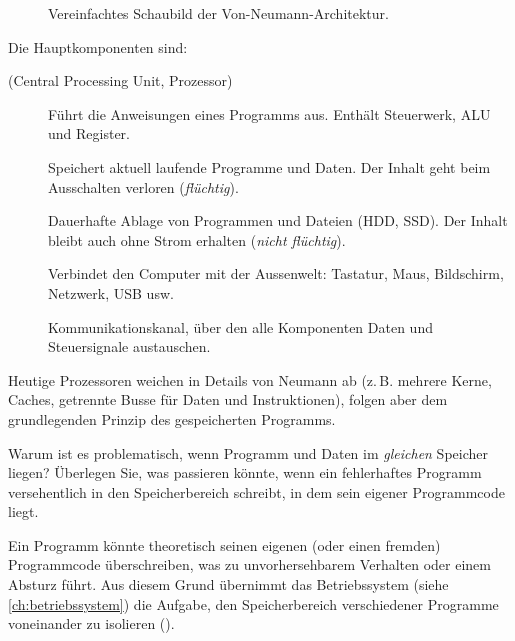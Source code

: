 \begin{figure}[H]
    \centering
    
    \caption{Vereinfachtes Schaubild der Von-Neumann-Architektur.}
    \label{fig:von_neumann}
\end{figure}

Die Hauptkomponenten sind:

\begin{description}
    \item[ (Central Processing Unit, Prozessor)] Führt die Anweisungen eines Programms aus. Enthält Steuerwerk, ALU und Register.
    \item[] Speichert aktuell laufende Programme und Daten. Der Inhalt geht beim Ausschalten verloren (\emph{flüchtig}).
    \item[] Dauerhafte Ablage von Programmen und Dateien (HDD, SSD). Der Inhalt bleibt auch ohne Strom erhalten (\emph{nicht flüchtig}).
    \item[] Verbindet den Computer mit der Aussenwelt: Tastatur, Maus, Bildschirm, Netzwerk, USB usw.
    \item[] Kommunikationskanal, über den alle Komponenten Daten und Steuersignale austauschen.
\end{description}

\begin{myremark}
    Heutige Prozessoren weichen in Details von Neumann ab (z.\,B. mehrere Kerne, Caches, getrennte Busse für Daten und Instruktionen), folgen aber dem grundlegenden Prinzip des gespeicherten Programms.
\end{myremark}

\begin{myexercise}
    Warum ist es problematisch, wenn Programm und Daten im \emph{gleichen} Speicher liegen? Überlegen Sie, was passieren könnte, wenn ein fehlerhaftes Programm versehentlich in den Speicherbereich schreibt, in dem sein eigener Programmcode liegt.
    \begin{myanswer}
        Ein Programm könnte theoretisch seinen eigenen (oder einen fremden) Programmcode überschreiben, was zu unvorhersehbarem Verhalten oder einem Absturz führt. Aus diesem Grund übernimmt das Betriebssystem (siehe \cref{ch:betriebssystem}) die Aufgabe, den Speicherbereich verschiedener Programme voneinander zu isolieren ().
    \end{myanswer}
\end{myexercise}

